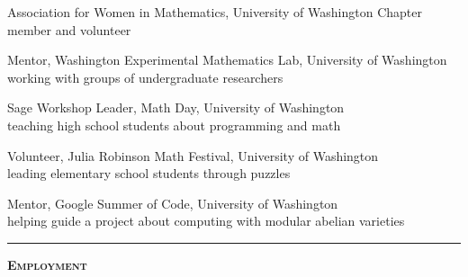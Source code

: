 \documentclass[12pt]{article}
\newcommand{\sectionheading}[1]
{
\bigskip %
\noindent
\hspace{-6.5mm}\textcolor{Gray}{\rule[.75mm]{21.5mm}{1mm}} %
\hspace{.2mm}	%
{\large{\textbf{\textsc{#1}}}} %
}
\newenvironment{date_section}
	{
	\vspace{-1ex}
	\leftmargini = 15ex
		\begin{itemize}[
			labelsep = *,
			labelwidth = 9ex,
			labelindent = 0ex,
			itemindent = !,
			font=\normalfont,
			align=parleft
		]{}
		\itemsep=-1.5mm
	}
	{\end{itemize}\vspace{-2ex}}
\newcommand{\yearmo}[2]{
	\item[
		{\makebox[1ex][r]{#1}}
		\hspace{1ex}
		{\makebox[1ex][l]{#2} }
		] }
\newcommand{\yearrange}[2]{
	\item[
		{\makebox[1ex][r]{#1}}
		--
		{\makebox[1ex][l]{#2} }
		] }
\begin{document}
		\begin{date_section}
			
			\yearrange{2015}{2018}
				Association for Women in Mathematics,
				University of Washington Chapter
				\\ member and volunteer
			
			\yearrange{2016}{2017}
				Mentor,
				Washington Experimental Mathematics Lab,
				University of Washington
				\\ working with groups of undergraduate researchers
				
			\yearmo{}{2017} %
				Sage Workshop Leader,
				Math Day,
				University of Washington
				\\ teaching high school students about programming and math
				
			\yearmo{}{2017} %
				Volunteer,
				Julia Robinson Math Festival,
				University of Washington
				\\ leading elementary school students through puzzles

			\yearmo{}{2016} %
				Mentor,
				Google Summer of Code,
				University of Washington
				\\ helping guide a project about computing with modular abelian varieties

%			
%
%
%
%

		\end{date_section}


	\sectionheading{Employment}%
	
\end{document}
